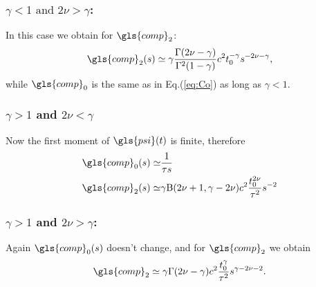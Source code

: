 \subsubsection{$\gamma<1 \text{ and } 2\nu>\gamma$: }
In this case we obtain for $\gls{comp}_2$:
\begin{equation}
  \gls{comp}_2(s) \simeq  \gamma   \frac{\Gamma(2\nu-\gamma)}{\Gamma^2(1-\gamma)} c^2 t_0^{-\gamma} s^{-2\nu-\gamma},
\end{equation}
while $\gls{comp}_0$ is the same as in Eq.(\ref{eq:Co}) as long as $\gamma<1$.

\subsubsection{$\gamma>1$ and  $2\nu<\gamma$}
Now the first moment of $\gls{psi}(t)$ is finite, therefore 
\begin{align}
 \gls{comp}_0(s) \simeq &  \frac{1}{\tau s}  \\
 \gls{comp}_2(s) \simeq & \gamma \mathrm{B}(2\nu+1,\gamma-2\nu) c^2 \frac{t_0^{2\nu}}{\tau^2}  s^{-2}
\end{align}


\subsubsection{$\gamma>1$ and $2\nu>\gamma$: }
Again $\gls{comp}_0(s)$ doesn't change, and for $\gls{comp}_2$ we obtain
\begin{equation}
\gls{comp}_2 \simeq  \gamma \Gamma(2\nu-\gamma)  c^2 \frac{t_0^\gamma}{\tau^2}   s^{\gamma-2\nu -2} .
\end{equation}

